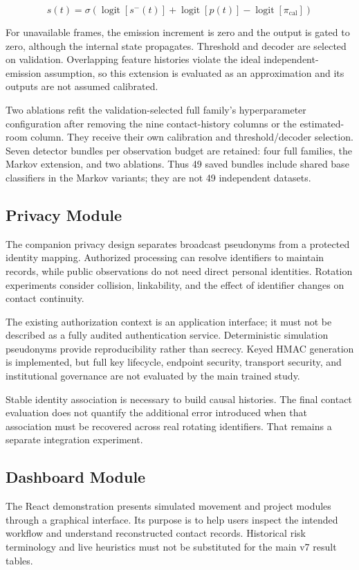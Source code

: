 \documentclass[12pt,a4paper]{report}
\begin{document}
\begin{equation}
s(t)=\sigma\!\left(\operatorname{logit}[s^-(t)]+\operatorname{logit}[p(t)]-\operatorname{logit}[\pi_{\mathrm{cal}}]\right)
\label{eq:source9}
\end{equation}

For unavailable frames, the emission increment is zero and the output is gated to zero, although the internal state propagates. Threshold and decoder are selected on validation. Overlapping feature histories violate the ideal independent-emission assumption, so this extension is evaluated as an approximation and its outputs are not assumed calibrated.

Two ablations refit the validation-selected full family's hyperparameter configuration after removing the nine contact-history columns or the estimated-room column. They receive their own calibration and threshold/decoder selection. Seven detector bundles per observation budget are retained: four full families, the Markov extension, and two ablations. Thus 49 saved bundles include shared base classifiers in the Markov variants; they are not 49 independent datasets.

\subsection{Privacy Module}
The companion privacy design separates broadcast pseudonyms from a protected identity mapping. Authorized processing can resolve identifiers to maintain records, while public observations do not need direct personal identities. Rotation experiments consider collision, linkability, and the effect of identifier changes on contact continuity.

The existing authorization context is an application interface; it must not be described as a fully audited authentication service. Deterministic simulation pseudonyms provide reproducibility rather than secrecy. Keyed HMAC generation is implemented, but full key lifecycle, endpoint security, transport security, and institutional governance are not evaluated by the main trained study.

Stable identity association is necessary to build causal histories. The final contact evaluation does not quantify the additional error introduced when that association must be recovered across real rotating identifiers. That remains a separate integration experiment.

\subsection{Dashboard Module}
The React demonstration presents simulated movement and project modules through a graphical interface. Its purpose is to help users inspect the intended workflow and understand reconstructed contact records. Historical risk terminology and live heuristics must not be substituted for the main v7 result tables.
\end{document}
